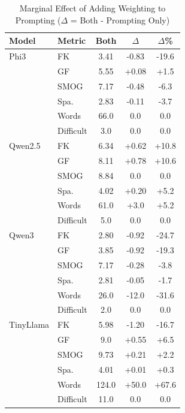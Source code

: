 \documentclass[10pt, a4paper]{article}
\begin{document}
\begin{table}[!ht]
\begin{center}
\begin{tabular}{llccc}
\hline
\textbf{Model} & \textbf{Metric} & \textbf{Both} & \textbf{$\Delta$} & \textbf{$\Delta$\%} \\
\hline
Phi3      & FK          & 3.41 & -0.83 & -19.6  \\
          & GF          & 5.55 & +0.08 & +1.5  \\
          & SMOG        & 7.17 & -0.48 & -6.3  \\
          & Spa.        & 2.83 & -0.11 & -3.7  \\
          & Words       & 66.0 & 0.0  & 0.0  \\
          & Difficult & 3.0  & 0.0  & 0.0  \\
\hline
Qwen2.5   & FK          & 6.34  & +0.62 & +10.8 \\
          & GF          & 8.11 & +0.78 & +10.6 \\
          & SMOG        & 8.84  & 0.0 & 0.0  \\
          & Spa.        & 4.02  & +0.20 & +5.2 \\
          & Words       & 61.0  & +3.0  & +5.2 \\
          & Difficult & 5.0   & 0.0  & 0.0 \\
\hline
Qwen3     & FK          & 2.80 & -0.92 & -24.7  \\
          & GF          & 3.85 & -0.92 & -19.3  \\
          & SMOG        & 7.17 & -0.28 & -3.8  \\
          & Spa.        & 2.81 & -0.05 & -1.7  \\
          & Words       & 26.0 & -12.0  & -31.6 \\
          & Difficult & 2.0  & 0.0  & 0.0  \\
\hline
TinyLlama & FK          & 5.98  & -1.20 & -16.7 \\
          & GF          & 9.0  & +0.55 & +6.5 \\
          & SMOG        & 9.73  & +0.21 & +2.2  \\
          & Spa.        & 4.01  & +0.01 & +0.3 \\
          & Words       & 124.0  & +50.0 & +67.6 \\
          & Difficult & 11.0   & 0.0   & 0.0   \\
\hline
\end{tabular}
\caption{Marginal Effect of Adding Weighting to Prompting ($\Delta$ = Both - Prompting Only)}
\label{tab:table2}
\end{center}
\end{table}
\end{document}
